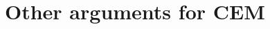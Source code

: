 \documentclass[If.tex]{subfiles}
\begin{document}
\section{Other arguments for CEM}
\gap\begin{comment}
Let us briefly report on some other arguments for CEM that can be found in the literature, having to do with a range of embedded constructions. The first argument, due to \textbf{Barker and von Fintel}, turns on the behaviour of ‘only if’. In a wide range of cases involving both indicatives and counterfactuals, ‘P only if Q’ seems to entail ‘If not Q, not P’. Given the standard account of ‘only’ (\textbf{cite Rooth etc.}), the semantic effect of adding ‘only’ to a sentence is to negate a certain range of relevant alternatives to that sentence, which differ with respect to the constituent acted on by ‘only’. Using this machinery it is easy to account for the validity of an inference from ‘P only if Q’ to ‘Not: P if not Q’: we need only say that in context, the relevant alternative to ‘if Q’ is ‘if not Q’. (It would also suffice if we posited a range of relevant alternatives whose disjunction is equivalent to ‘not Q’.) But without CEM, there is no way to bridge the gap from ‘Not: P if not Q’ to ‘If not Q, not P’.%

\end{comment}
\end{document}
